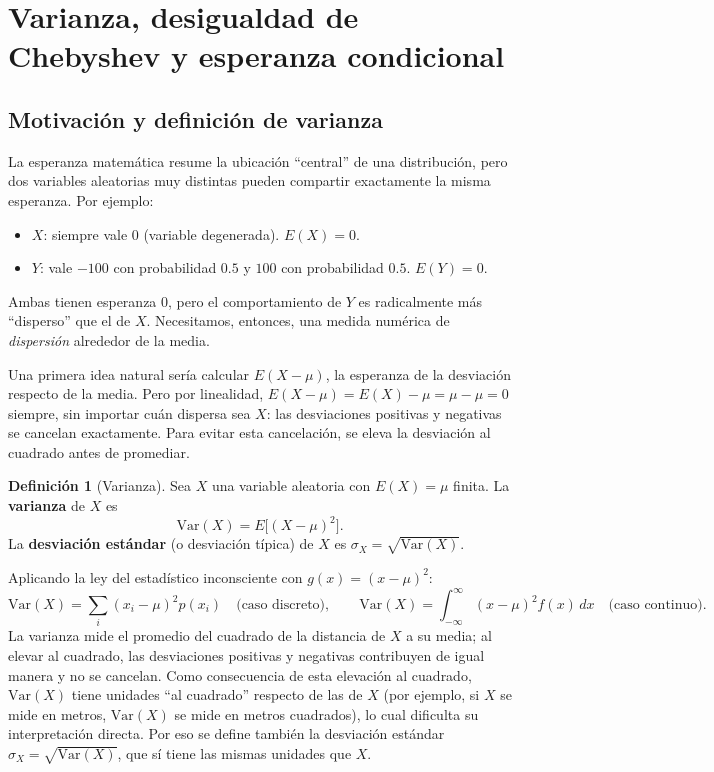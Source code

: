 \documentclass[11pt,a4paper]{article}
\theoremstyle{plain}
\theoremstyle{definition}
\newtheorem{definicion}[teorema]{Definición}
\theoremstyle{remark}
\begin{document}
\newpage
\section{Varianza, desigualdad de Chebyshev y esperanza condicional}
\label{sec:varianza}

\subsection{Motivación y definición de varianza}

La esperanza matemática resume la ubicación ``central'' de una distribución, pero dos variables aleatorias muy distintas pueden compartir exactamente la misma esperanza. Por ejemplo:
\begin{itemize}
\item $X$: siempre vale $0$ (variable degenerada). $E(X)=0$.
\item $Y$: vale $-100$ con probabilidad $0.5$ y $100$ con probabilidad $0.5$. $E(Y)=0$.
\end{itemize}
Ambas tienen esperanza $0$, pero el comportamiento de $Y$ es radicalmente más ``disperso'' que el de $X$. Necesitamos, entonces, una medida numérica de \emph{dispersión} alrededor de la media.

Una primera idea natural sería calcular $E(X-\mu)$, la esperanza de la desviación respecto de la media. Pero por linealidad, $E(X-\mu)=E(X)-\mu=\mu-\mu=0$ siempre, sin importar cuán dispersa sea $X$: las desviaciones positivas y negativas se cancelan exactamente. Para evitar esta cancelación, se eleva la desviación al cuadrado antes de promediar.

\begin{definicion}[Varianza]
Sea $X$ una variable aleatoria con $E(X)=\mu$ finita. La \textbf{varianza} de $X$ es
\[
\text{Var}(X) = E\big[(X-\mu)^2\big].
\]
La \textbf{desviación estándar} (o desviación típica) de $X$ es $\sigma_X = \sqrt{\text{Var}(X)}$.
\end{definicion}

Aplicando la ley del estadístico inconsciente con $g(x)=(x-\mu)^2$:
\[
\text{Var}(X) = \sum_i (x_i-\mu)^2 p(x_i) \quad\text{(caso discreto)}, \qquad \text{Var}(X) = \int_{-\infty}^\infty (x-\mu)^2 f(x)\,dx \quad\text{(caso continuo)}.
\]
La varianza mide el promedio del cuadrado de la distancia de $X$ a su media; al elevar al cuadrado, las desviaciones positivas y negativas contribuyen de igual manera y no se cancelan. Como consecuencia de esta elevación al cuadrado, $\text{Var}(X)$ tiene unidades ``al cuadrado'' respecto de las de $X$ (por ejemplo, si $X$ se mide en metros, $\text{Var}(X)$ se mide en metros cuadrados), lo cual dificulta su interpretación directa. Por eso se define también la desviación estándar $\sigma_X=\sqrt{\text{Var}(X)}$, que sí tiene las mismas unidades que $X$.
\end{document}
